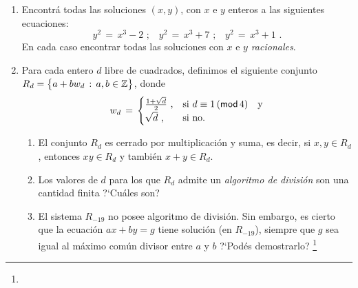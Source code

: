 \begin{enumerate}[label=P\arabic*]
\begin{enumerate}[label=(\alph*)]
				es una potencia de un n\'umero primo, $p^k$.
			\item
				Para cada primo $p$ y cada entero positivo $k$,
				existe un cuerpo de $p^k$ elementos.
			\item
				Si dos cuerpos finitos tienen la misma cantidad de
				elementos, entonces son \emph{isomorfos}.
			\item
				Todo cuerpo finito tiene una ra\'{\i}z primitiva.
		\end{enumerate}
	\item\label{item:diofanticas}
		Encontr\'a todas las soluciones $(x,y)$, con $x$ e $y$
		enteros a las siguientes ecuaciones:
		\begin{displaymath}
			y^2\,=\,x^3-2 \text{ ;}\quad
			y^2\,=\,x^3+7 \text{ ;}\quad
			y^2\,=\,x^3+1 \text{ .}
		\end{displaymath}
		En cada caso encontrar todas las soluciones con
		$x$ e $y$ \emph{racionales}.
	\item\label{item:cuadraticos}
		Para cada entero $d$ libre de cuadrados, definimos
		el siguiente conjunto
		\begin{math}
			R_d=\big\{a+bw_d\,:\,a,b\in\Enteros\big\}
		\end{math}, donde
		\begin{displaymath}
			w_d\,=\,
				\begin{cases}
					\frac{1+\sqrt d} 2
					\text{ ,} &
					\text{si } d\equiv 1\tmodulo[4]
					\quad\text{y} \\
					\sqrt d \text{ ,} &
					\text{si no.}
				\end{cases}
		\end{displaymath}
		\begin{enumerate}[label=(\alph*)]
			\item
				El conjunto $R_d$ es cerrado por
				multiplicaci\'on y suma, es decir,
				si $x,y\in R_d$, entonces $xy\in R_d$
				y tambi\'en $x+y\in R_d$.
			\item
				Los valores de $d$ para los que $R_d$
				admite un \emph{algoritmo de divisi\'on}
				son una cantidad finita ?`Cu\'ales son?
			\item
				El sistema $R_{-19}$ no posee algoritmo
				de divisi\'on. Sin embargo, es cierto que
				la ecuaci\'on
				\begin{math}
					ax+by=g
				\end{math}
				tiene soluci\'on (en $R_{-19}$), siempre
				que $g$ sea igual al m\'aximo com\'un
				divisor entre $a$ y $b$
				?`Pod\'es demostrarlo?%
				\footnote{
}
\end{enumerate}
\end{enumerate}
